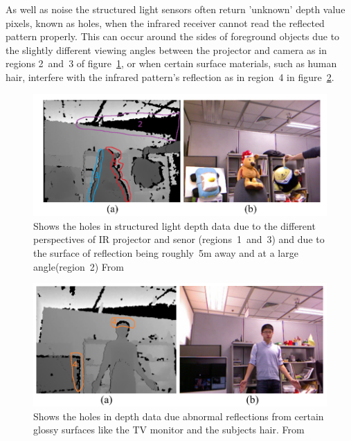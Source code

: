 \documentclass[11pt]{article} %
\begin{document}
As well as noise the structured light sensors often return 'unknown' depth value pixels, known as holes, when the infrared receiver cannot read the reflected pattern properly. This can occur around the sides of foreground objects due to the slightly different viewing angles between the projector and camera as in regions 2~and~3 of figure~\ref{fig:kinectHoles4}, or when certain surface materials, such as human hair, interfere with the infrared pattern's reflection as in region~4 in figure~\ref{fig:kinectHoles3}. 
 \begin{figure}
\includegraphics*[width=1\linewidth,clip,trim={1cm 1.5cm 1cm 1cm}]{kinectHoles4}
\caption{Shows the holes in structured light depth data due to the different perspectives of IR projector and senor (regions~1~and~3) and due to the surface of reflection being roughly~5m away and at a large angle(region~2) From~\cite{Feng2013}		\label{fig:kinectHoles4}  } 
\end{figure}
 \begin{figure}
\includegraphics*[width=1\linewidth,clip,trim={1cm 1.5cm 1cm 1cm}]{kinectHoles3}
\caption{Shows the holes in depth data due abnormal reflections from certain glossy surfaces like the TV monitor and the subjects hair.  From~\cite{Feng2013}			\label{fig:kinectHoles3}  } 
\end{figure}

\end{document}
